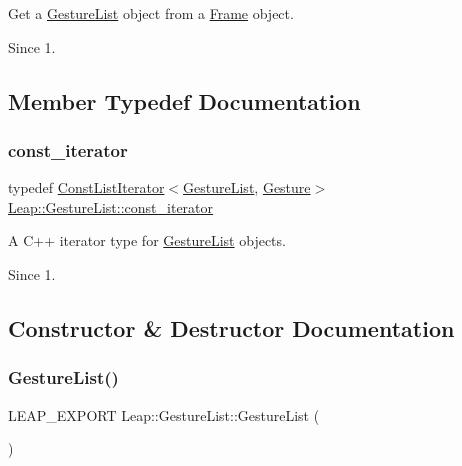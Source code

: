 Get a \hyperlink{class_leap_1_1_gesture_list}{Gesture\+List} object from a \hyperlink{class_leap_1_1_frame}{Frame} object. \begin{DoxySince}{Since}
1. 
\end{DoxySince}


\subsection{Member Typedef Documentation}
\mbox{\label{class_leap_1_1_gesture_list_aaf2fd030e686892a0da42d81fc0cad88}} 
\subsubsection{\texorpdfstring{const\+\_\+iterator}{const\_iterator}}
{\footnotesize\ttfamily typedef \hyperlink{class_leap_1_1_const_list_iterator}{Const\+List\+Iterator}$<$\hyperlink{class_leap_1_1_gesture_list}{Gesture\+List}, \hyperlink{class_leap_1_1_gesture}{Gesture}$>$ \hyperlink{class_leap_1_1_gesture_list_aaf2fd030e686892a0da42d81fc0cad88}{Leap\+::\+Gesture\+List\+::const\+\_\+iterator}}

A C++ iterator type for \hyperlink{class_leap_1_1_gesture_list}{Gesture\+List} objects.


\begin{DoxyCodeInclude}
\end{DoxyCodeInclude}
 \begin{DoxySince}{Since}
1. 
\end{DoxySince}


\subsection{Constructor \& Destructor Documentation}
\mbox{\label{class_leap_1_1_gesture_list_aad564fe5be92fb93119da56f08963142}} 
\subsubsection{\texorpdfstring{Gesture\+List()}{GestureList()}}
{\footnotesize\ttfamily L\+E\+A\+P\+\_\+\+E\+X\+P\+O\+RT Leap\+::\+Gesture\+List\+::\+Gesture\+List (\begin{DoxyParamCaption}{ }\end{DoxyParamCaption})}

